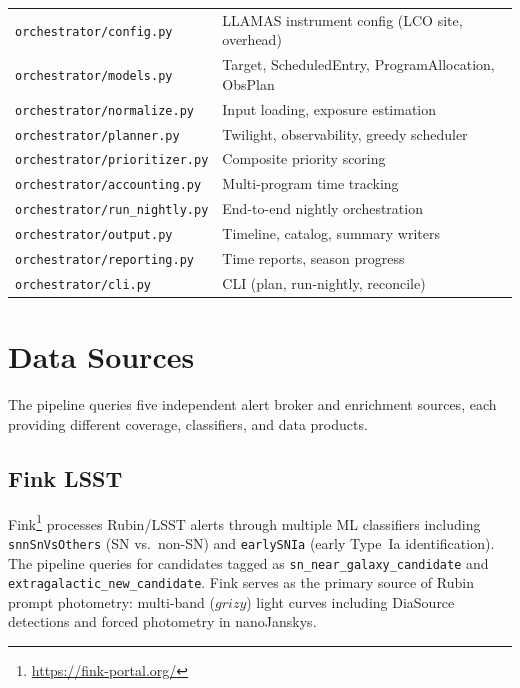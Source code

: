 \documentclass[11pt,letterpaper]{article}
\begin{document}
\begin{center}
\begin{tabular}{ll}
\texttt{orchestrator/config.py} & LLAMAS instrument config (LCO site, overhead) \\
\texttt{orchestrator/models.py} & Target, ScheduledEntry, ProgramAllocation, ObsPlan \\
\texttt{orchestrator/normalize.py} & Input loading, exposure estimation \\
\texttt{orchestrator/planner.py} & Twilight, observability, greedy scheduler \\
\texttt{orchestrator/prioritizer.py} & Composite priority scoring \\
\texttt{orchestrator/accounting.py} & Multi-program time tracking \\
\texttt{orchestrator/run\_nightly.py} & End-to-end nightly orchestration \\
\texttt{orchestrator/output.py} & Timeline, catalog, summary writers \\
\texttt{orchestrator/reporting.py} & Time reports, season progress \\
\texttt{orchestrator/cli.py} & CLI (plan, run-nightly, reconcile) \\
\bottomrule
\end{tabular}
\end{center}


\section{Data Sources}
\label{sec:data_sources}

The pipeline queries five independent alert broker and enrichment
sources, each providing different coverage, classifiers, and data
products.

\subsection{Fink LSST}

Fink\footnote{\url{https://fink-portal.org/}} processes Rubin/LSST
alerts through multiple ML classifiers including
\texttt{snnSnVsOthers} (SN vs.\ non-SN) and \texttt{earlySNIa} (early
Type~Ia identification).  The pipeline queries for candidates tagged as
\texttt{sn\_near\_galaxy\_candidate} and
\texttt{extragalactic\_new\_candidate}.  Fink serves as the primary
source of Rubin prompt photometry: multi-band ($grizy$) light curves
including DiaSource detections and forced photometry in nanoJanskys.
\end{document}
